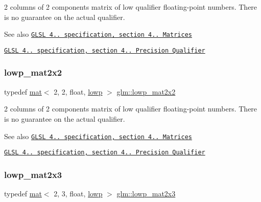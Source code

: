 2 columns of 2 components matrix of low qualifier floating-\/point numbers. There is no guarantee on the actual qualifier.

\begin{DoxySeeAlso}{See also}
\href{http://www.opengl.org/registry/doc/GLSLangSpec.4.20.8.pdf}{\tt G\+L\+SL 4.. specification, section 4.. Matrices} 

\href{http://www.opengl.org/registry/doc/GLSLangSpec.4.20.8.pdf}{\tt G\+L\+SL 4.. specification, section 4.. Precision Qualifier} 
\end{DoxySeeAlso}
\mbox{\label{group__core__precision_gaab9064a0fd0e3ac8d4ae8ceb2dc4fe56}} 
\subsubsection{\texorpdfstring{lowp\+\_\+mat2x2}{lowp\_mat2x2}}
{\footnotesize\ttfamily typedef \mbox{\hyperlink{structglm_1_1mat}{mat}}$<$ 2, 2, float, \mbox{\hyperlink{namespaceglm_a36ed105b07c7746804d7fdc7cc90ff25ae161af3fc695e696ce3bf69f7332bc2d}{lowp}} $>$ \mbox{\hyperlink{group__core__precision_gaab9064a0fd0e3ac8d4ae8ceb2dc4fe56}{glm\+::lowp\+\_\+mat2x2}}}

2 columns of 2 components matrix of low qualifier floating-\/point numbers. There is no guarantee on the actual qualifier.

\begin{DoxySeeAlso}{See also}
\href{http://www.opengl.org/registry/doc/GLSLangSpec.4.20.8.pdf}{\tt G\+L\+SL 4.. specification, section 4.. Matrices} 

\href{http://www.opengl.org/registry/doc/GLSLangSpec.4.20.8.pdf}{\tt G\+L\+SL 4.. specification, section 4.. Precision Qualifier} 
\end{DoxySeeAlso}
\mbox{\label{group__core__precision_gafb73af64c7fb56c398efec50b5cb5108}} 
\subsubsection{\texorpdfstring{lowp\+\_\+mat2x3}{lowp\_mat2x3}}
{\footnotesize\ttfamily typedef \mbox{\hyperlink{structglm_1_1mat}{mat}}$<$ 2, 3, float, \mbox{\hyperlink{namespaceglm_a36ed105b07c7746804d7fdc7cc90ff25ae161af3fc695e696ce3bf69f7332bc2d}{lowp}} $>$ \mbox{\hyperlink{group__core__precision_gafb73af64c7fb56c398efec50b5cb5108}{glm\+::lowp\+\_\+mat2x3}}}


